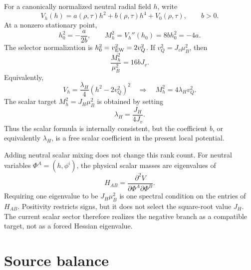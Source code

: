 \documentclass[11pt]{article}
\theoremstyle{plain}
\theoremstyle{definition}
\begin{document}
For a canonically normalized neutral radial field \(h\), write
\begin{equation}
  V_h(h)=a(\rho,\tau)h^2+b(\rho,\tau)h^4+V_0(\rho,\tau),
  \qquad b>0 .
  \label{eq:vh-general}
\end{equation}
At a nonzero stationary point,
\begin{equation}
  h_0^2=-\frac{a}{2b},
  \qquad
  M_h^2=V_h''(h_0)=8bh_0^2=-4a .
  \label{eq:hessian-general}
\end{equation}
The selector normalization is \(h_0^2=v_{\rm EW}^2=2v_Q^2\).  If
\(v_Q^2=J_v\mu_B^2\), then
\begin{equation}
  \frac{M_h^2}{\mu_B^2}=16bJ_v .
  \label{eq:mh-free-b}
\end{equation}
Equivalently,
\begin{equation}
  V_h=\frac{\lambda_H}{4}(h^2-2v_Q^2)^2
  \quad\Rightarrow\quad
  M_h^2=4\lambda_Hv_Q^2 .
  \label{eq:vh-lambda}
\end{equation}
The scalar target \(M_h^2=J_H\mu_B^2\) is obtained by setting
\begin{equation}
  \lambda_H=\frac{J_H}{4J_v}.
  \label{eq:lambda-target-repeat}
\end{equation}
Thus the scalar formula is internally consistent, but the coefficient
\(b\), or equivalently \(\lambda_H\), is a free scalar coefficient in the
present local potential.

Adding neutral scalar mixing does not change this rank count.  For neutral
variables \(\Phi^A=(h,\phi^i)\), the physical scalar masses are eigenvalues of
\begin{equation}
  H_{AB}=\frac{\partial^2V}{\partial\Phi^A\partial\Phi^B}.
  \label{eq:neutral-hessian}
\end{equation}
Requiring one eigenvalue to be \(J_H\mu_B^2\) is one spectral condition on the
entries of \(H_{AB}\).  Positivity restricts signs, but it does not select the
square-root value \(J_H\).  The current scalar sector therefore realizes the
negative branch as a compatible target, not as a forced Hessian eigenvalue.

\section{Source balance}
\end{document}
